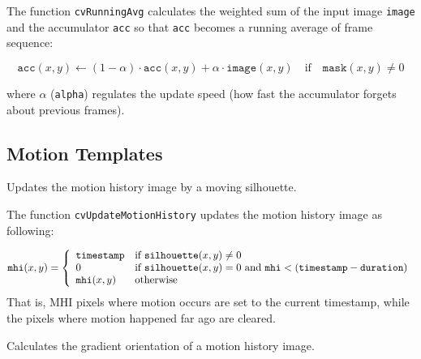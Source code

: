 The function \texttt{cvRunningAvg} calculates the weighted sum of the input image
\texttt{image} and the accumulator \texttt{acc} so that \texttt{acc}
becomes a running average of frame sequence:

\[ \texttt{acc}(x,y) \leftarrow (1-\alpha) \cdot \texttt{acc}(x,y) + \alpha \cdot \texttt{image}(x,y) \quad \text{if} \quad \texttt{mask}(x,y) \ne 0 \]

where $\alpha$ (\texttt{alpha}) regulates the update speed (how fast the accumulator forgets about previous frames).

\subsection{Motion Templates}

\label{UpdateMotionHistory}

Updates the motion history image by a moving silhouette.


\begin{description}
\end{description}

The function \texttt{cvUpdateMotionHistory} updates the motion history image as following:

\[
\texttt{mhi}(x,y)=\left\{ \begin{array}{l l} \texttt{timestamp} & \mbox{if $\texttt{silhouette}(x,y) \ne 0$}\\ 0 & \mbox{if $\texttt{silhouette}(x,y) = 0$ and $\texttt{mhi} < (\texttt{timestamp} - \texttt{duration})$}\\ \texttt{mhi}(x,y) & \mbox{otherwise}\\ \end{array} \right.
\]
That is, MHI pixels where motion occurs are set to the current timestamp, while the pixels where motion happened far ago are cleared.

\label{CalcMotionGradient}

Calculates the gradient orientation of a motion history image.

